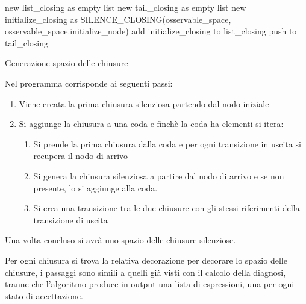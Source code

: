 \begin{algorithm}[H]
\SetAlgoLined
{}
 new list\_closing as empty list\;
 new tail\_closing as empty list\;
 \;
 new initialize\_closing as SILENCE\_CLOSING(osservable\_space, osservable\_space.initialize\_node)\;
 add initialize\_closing to list\_closing\;
 push  to tail\_closing\;
 
 
 \caption{Generazione spazio delle chiusure}
\end{algorithm}

Nel programma corrisponde ai seguenti passi:
\begin{enumerate}
    \item Viene creata la prima chiusura silenziosa partendo dal nodo iniziale
    \item Si aggiunge la chiusura a una coda e finchè la coda ha elementi si itera:
    \begin{enumerate}
        \item Si prende la prima chiusura dalla coda e per ogni transizione in uscita si recupera il nodo di arrivo
        \item Si genera la chiusura silenziosa a partire dal nodo di arrivo e se non presente, lo si aggiunge alla coda.
        \item Si crea una transizione tra le due chiusure con gli stessi riferimenti della transizione di uscita
    \end{enumerate}
\end{enumerate}

Una volta concluso si avrà uno spazio delle chiusure silenziose.

Per ogni chiusura si trova la relativa decorazione per decorare lo spazio delle chiusure, i passaggi sono simili a quelli già visti con il calcolo della diagnosi, tranne che l’algoritmo produce in output una lista di espressioni, una per ogni stato di accettazione.

